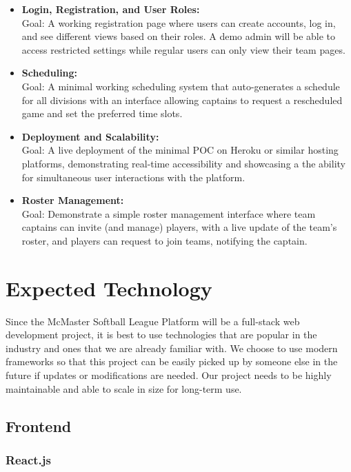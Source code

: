 \documentclass{article}
\begin{document}
\begin{itemize}
	\item \textbf{Login, Registration, and User Roles:} \\ Goal: A working registration page where users can create accounts, log in, and see different views based on their roles. A demo admin will be able to access restricted settings while regular users can only view their team pages. 
  \item \textbf{Scheduling:} \\ Goal: A minimal working scheduling system that auto-generates a schedule for all divisions with an interface allowing captains to request a rescheduled game and set the preferred time slots.
  \item \textbf{Deployment and Scalability:} \\ Goal: A live deployment of the minimal POC on Heroku or similar hosting platforms, demonstrating real-time accessibility and showcasing a the ability for simultaneous user interactions with the platform.
  \item \textbf{Roster Management:} \\ Goal: Demonstrate a simple roster management interface where team captains can invite (and manage) players, with a live update of the team's roster, and players can request to join teams, notifying the captain. 
\end{itemize}

\section{Expected Technology}

Since the McMaster Softball League Platform will be a full-stack web development project, it is best to use technologies that are popular in the industry and ones that we are already familiar with. We choose to use modern frameworks so that this project can be easily picked up by someone else in the future if updates or modifications are needed. Our project needs to be highly maintainable and able to scale in size for long-term use.

\subsection*{Frontend}

\subsubsection*{React.js}
\end{document}
